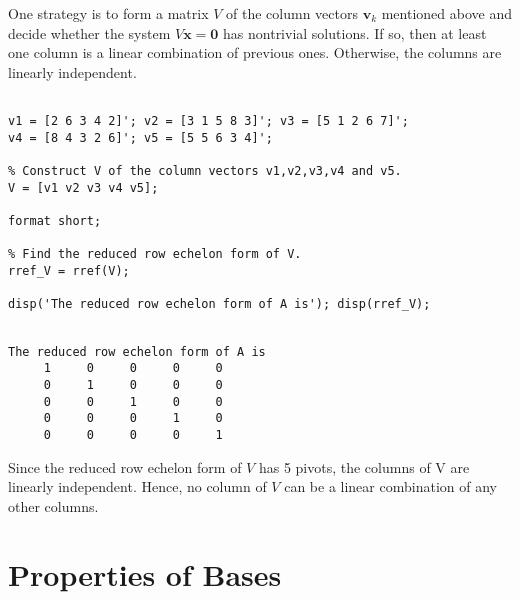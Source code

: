 \begin{sol}
\verb""
One strategy is to form a matrix $V$ of the column vectors $\mathbf{v}_{k}$ mentioned above and decide whether the system $V \mathbf{x} = \mathbf{0}$ has nontrivial solutions. If so, then at least one column is a linear combination of previous ones. Otherwise, the columns are linearly independent.

\begin{verbatim}

v1 = [2 6 3 4 2]'; v2 = [3 1 5 8 3]'; v3 = [5 1 2 6 7]';
v4 = [8 4 3 2 6]'; v5 = [5 5 6 3 4]';

% Construct V of the column vectors v1,v2,v3,v4 and v5.
V = [v1 v2 v3 v4 v5]; 

format short;

% Find the reduced row echelon form of V.
rref_V = rref(V); 

disp('The reduced row echelon form of A is'); disp(rref_V);
\end{verbatim}



\begin{outputs}

\begin{verbatim}

The reduced row echelon form of A is
     1     0     0     0     0
     0     1     0     0     0
     0     0     1     0     0
     0     0     0     1     0
     0     0     0     0     1
\end{verbatim}

\end{outputs}



\noindent Since the reduced row echelon form of $V$ has 5 pivots, the columns of V are linearly independent. Hence, no column of $V$ can be a linear combination of any other columns.
\end{sol}

\vspace{2mm}

\section{Properties of Bases}


